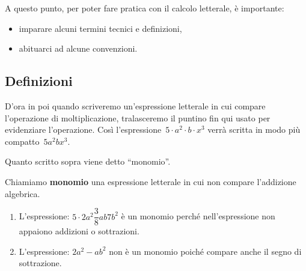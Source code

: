 A questo punto, per poter fare pratica con il calcolo letterale, 
è importante:
\begin{itemize} [nosep]
\item imparare alcuni termini tecnici e definizioni,
\item abituarci ad alcune convenzioni.
\end{itemize}


\subsection{Definizioni}
\label{subsec:monomi_definizioni}

D'ora in poi quando scriveremo un'espressione letterale in cui compare
l'operazione di moltiplicazione, tralasceremo il puntino fin qui usato 
per evidenziare l'operazione.
Così l'espressione~\(5 \cdot a^2 \cdot b \cdot x^3\) 
verrà scritta in modo
più compatto~\(5a^2bx^3\).

% 
Quanto scritto sopra viene detto ``monomio''.

\begin{definizione}{}{}
Chiamiamo \textbf{monomio} una espressione letterale in cui non compare
l'addizione algebrica.
\end{definizione}

\begin{esempio}{}{}
\begin{enumerate} [nosep]
\item 
L'espressione: \(5 \cdot 2a^{2} \dfrac{3}{8}ab7b^{2}\)
è un monomio perché nell'espressione non appaiono addizioni o sottrazioni.
\item 
L'espressione: \(2a^{2}-ab^{2}\) non è un monomio poiché compare anche il 
segno di sottrazione.
\end{enumerate}
\end{esempio}


